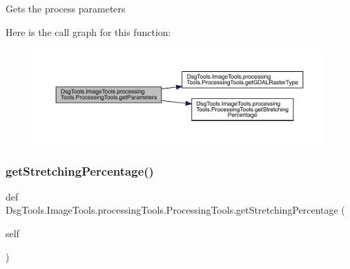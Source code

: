 \begin{DoxyVerb}Gets the process parameters
\end{DoxyVerb}
 Here is the call graph for this function\+:
\nopagebreak
\begin{figure}[H]
\begin{center}
\leavevmode
\includegraphics[width=350pt]{class_dsg_tools_1_1_image_tools_1_1processing_tools_1_1_processing_tools_a07fd0be59b4c07136425c265f6f50a48_cgraph}
\end{center}
\end{figure}
\mbox{\label{class_dsg_tools_1_1_image_tools_1_1processing_tools_1_1_processing_tools_a8e44625823c548a4773b69fa21f6a3fe}} 
\subsubsection{\texorpdfstring{get\+Stretching\+Percentage()}{getStretchingPercentage()}}
{\footnotesize\ttfamily def Dsg\+Tools.\+Image\+Tools.\+processing\+Tools.\+Processing\+Tools.\+get\+Stretching\+Percentage (\begin{DoxyParamCaption}\item[{}]{self }\end{DoxyParamCaption})}

